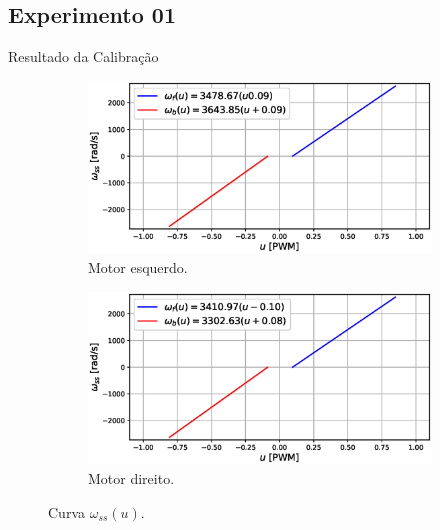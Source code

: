\subsection{Experimento 01}
\begin{frame}{Resultado da Calibração}

\begin{figure}
    \begin{subfigure}{.48\textwidth}
    \centering
        \includegraphics[width=1.15\textwidth]{figuras/resultados/exp01/curva_feedforward_esquerdo100.eps}
        \caption{Motor esquerdo.}
    \end{subfigure}
    \begin{subfigure}{.48\textwidth}
        \centering
        \includegraphics[width=1.15\textwidth]{figuras/resultados/exp01/curva_feedforward_direito100.eps}
        \caption{Motor direito.}
    \end{subfigure}
    \caption{Curva $\omega_{ss}(u)$.}
\end{figure}

\end{frame}

